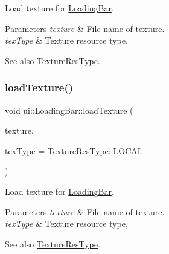 Load texture for \hyperlink{classui_1_1LoadingBar}{Loading\+Bar}.


\begin{DoxyParams}{Parameters}
{\em texture} & File name of texture. \\
\hline
{\em tex\+Type} & Texture resource type,\\
\hline
\end{DoxyParams}
\begin{DoxySeeAlso}{See also}
\hyperlink{classui_1_1Widget_a040a65ec5ad3b11119b7e16b98bd9af0}{Texture\+Res\+Type}. 
\end{DoxySeeAlso}
\mbox{\label{classui_1_1LoadingBar_a72f581d7571f9e592ae91a73657a4862}} 
\subsubsection{\texorpdfstring{load\+Texture()}{loadTexture()}\hspace{0.1cm}{\footnotesize\ttfamily [2/2]}}
{\footnotesize\ttfamily void ui\+::\+Loading\+Bar\+::load\+Texture (\begin{DoxyParamCaption}\item[{const std\+::string \&}]{texture,  }\item[{\hyperlink{classui_1_1Widget_a040a65ec5ad3b11119b7e16b98bd9af0}{Texture\+Res\+Type}}]{tex\+Type = {\ttfamily TextureResType\+:\+:LOCAL} }\end{DoxyParamCaption})}

Load texture for \hyperlink{classui_1_1LoadingBar}{Loading\+Bar}.


\begin{DoxyParams}{Parameters}
{\em texture} & File name of texture. \\
\hline
{\em tex\+Type} & Texture resource type,\\
\hline
\end{DoxyParams}
\begin{DoxySeeAlso}{See also}
\hyperlink{classui_1_1Widget_a040a65ec5ad3b11119b7e16b98bd9af0}{Texture\+Res\+Type}. 
\end{DoxySeeAlso}
\mbox{\label{classui_1_1LoadingBar_aa639bb577b731423bfce094995c61706}} 
